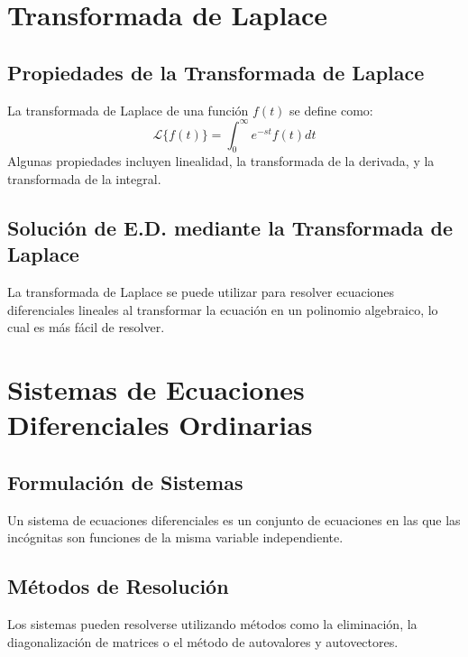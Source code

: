 \documentclass{article}
\begin{document}
\section{Transformada de Laplace}

\subsection{Propiedades de la Transformada de Laplace}
La transformada de Laplace de una función \( f(t) \) se define como:
\[
\mathcal{L}\{f(t)\} = \int_0^{\infty} e^{-st} f(t) dt
\]
Algunas propiedades incluyen linealidad, la transformada de la derivada, y la transformada de la integral.

\subsection{Solución de E.D. mediante la Transformada de Laplace}
La transformada de Laplace se puede utilizar para resolver ecuaciones diferenciales lineales al transformar la ecuación en un polinomio algebraico, lo cual es más fácil de resolver.

\section{Sistemas de Ecuaciones Diferenciales Ordinarias}

\subsection{Formulación de Sistemas}
Un sistema de ecuaciones diferenciales es un conjunto de ecuaciones en las que las incógnitas son funciones de la misma variable independiente.

\subsection{Métodos de Resolución}
Los sistemas pueden resolverse utilizando métodos como la eliminación, la diagonalización de matrices o el método de autovalores y autovectores.



\end{document}
